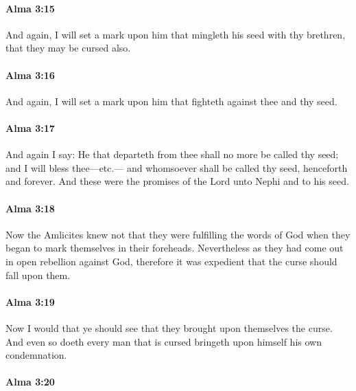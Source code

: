 		\paragraph{Alma 3:15} %
			\label{ALMA-3-15}

			And again, I will set a mark upon him that mingleth his seed with thy brethren,
			that they may be cursed also.

		\paragraph{Alma 3:16} %
			\label{ALMA-3-16}

			And again, I will set a mark upon him that fighteth against thee and thy seed.

		\paragraph{Alma 3:17} %
			\label{ALMA-3-17}

			And again I say:
			He that departeth from thee shall no more be called thy seed;
			and I will bless thee---etc.---
			and whomsoever shall be called thy seed, henceforth and forever.
			And these were the promises of the Lord unto Nephi and to his seed.

		\paragraph{Alma 3:18} %
			\label{ALMA-3-18}

			Now the Amlicites knew not that they were fulfilling the words of God
			when they began to mark themselves in their foreheads.
			Nevertheless as they had come out in open rebellion against God,
			therefore it was expedient that the curse should fall upon them.

		\paragraph{Alma 3:19} %
			\label{ALMA-3-19}

			Now I would that ye should see that they brought upon themselves the curse.
			And even so doeth every man that is cursed
			bringeth upon himself his own condemnation.

		\paragraph{Alma 3:20} %
			\label{ALMA-3-20}

